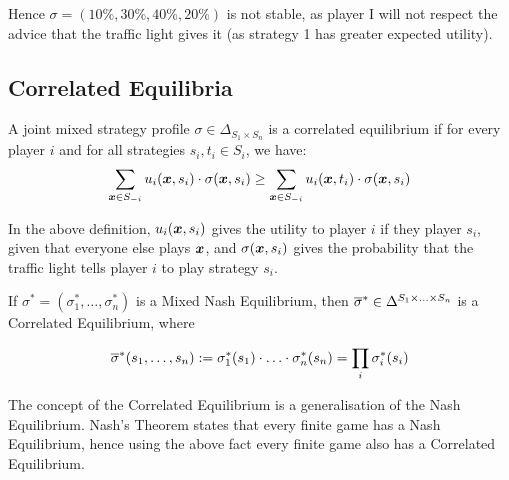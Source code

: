 Hence $\sigma = (10\%, 30\%, 40\%, 20\%)$ is not stable, as player I will not
respect the advice that the traffic light gives it (as strategy 1 has greater
expected utility).

\subsection{Correlated Equilibria}

\begin{definition}
	A joint mixed strategy profile $\sigma \in \Delta_{S_1 \times S_n}$ is
	a correlated equilibrium if for every player $i$ and for all strategies
	$s_i, t_i \in S_i$, we have:
	\begin{equation*}
		\sum_{\bm{x} \in S_{-i}} u_i(\bm{x}, s_i) \cdot
		\sigma(\bm{x}, s_i) \ge \sum_{\bm{x} \in S_{-i}} u_i(\bm{x},
		t_i) \cdot \sigma(\bm{x}, s_i)
	\end{equation*}
\end{definition}

In the above definition, $u_i(\bm{x}, s_i)$ gives the utility to player $i$
if they player $s_i$, given that everyone else plays $\bm{x}$, and
$\sigma(\bm{x}, s_i)$ gives the probability that the traffic light tells
player $i$ to play strategy $s_i$.

\begin{fact}
	If $\sigma^* = (\sigma^*_1, \ldots, \sigma^*_n)$ is a Mixed Nash
	Equilibrium, then $\overline{\sigma}^* \in \Delta^{S_1 \times \ldots \times
	S_n}$ is a Correlated Equilibrium, where

	\begin{equation*}
		\overline{\sigma}^* (s_1, \ldots, s_n) := \sigma^*_1 (s_1) \cdot \ldots
		\cdot \sigma^*_n (s_n) = \prod_i \sigma^*_i(s_i)
	\end{equation*}
\end{fact}

The concept of the Correlated Equilibrium is a generalisation of the Nash
Equilibrium. Nash's Theorem states that every finite game has a Nash
Equilibrium, hence using the above fact every finite game also has a Correlated
Equilibrium.

